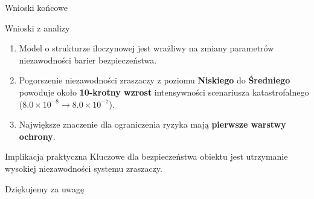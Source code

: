 \documentclass[aspectratio=169,11pt]{beamer}
\begin{document}
\begin{frame}{Wnioski końcowe}

\begin{block}{Wnioski z analizy}
\begin{enumerate}
\item Model o strukturze iloczynowej jest wrażliwy na zmiany parametrów niezawodności barier bezpieczeństwa.

\item Pogorszenie niezawodności zraszaczy z poziomu \textbf{Niskiego} do \textbf{Średniego} powoduje około \textbf{10-krotny wzrost} intensywności scenariusza katastrofalnego  
($8.0 \times 10^{-8} \rightarrow 8.0 \times 10^{-7}$).

\item Największe znaczenie dla ograniczenia ryzyka mają \textbf{pierwsze warstwy ochrony}.
\end{enumerate}
\end{block}

\vspace{0.2cm}

\begin{alertblock}{Implikacja praktyczna}
Kluczowe dla bezpieczeństwa obiektu jest utrzymanie wysokiej niezawodności systemu zraszaczy.
\end{alertblock}

\end{frame}

\begin{frame}[plain]

\begin{center}

\vspace{1.5cm}

{\Huge \textcolor{MainBlue}{Dziękujemy za uwagę}}


\end{center}

\end{frame}
\end{document}
